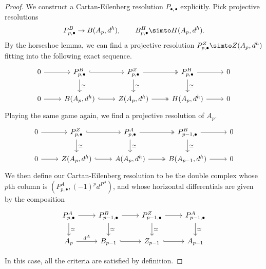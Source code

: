 \documentclass[main.tex]{subfiles}
\begin{document}
\begin{proof}
  We construct a Cartan-Eilenberg resolution $P_{\bullet,\bullet}$ explicitly. Pick projective resolutions
  \begin{equation*}
    P^{B}_{p,\bullet} \to B(A_{p}, d^{h}),\qquad B^{H}_{p,\bullet} \simto H(A_{p}, d^{h}).
  \end{equation*}
  By the horseshoe lemma, we can find a projective resolution $P^{Z}_{p,\bullet} \simto Z(A_{p}, d^{h})$ fitting into the following exact sequence.
  \begin{equation}
    \label{eq:cartan_eilenberg_resolution_ses_1}
    \begin{tikzcd}
      0
      \arrow[r]
      & P^{B}_{p,\bullet}
      \arrow[r, hook]
      \arrow[d, "\simeq"]
      & P^{Z}_{p,\bullet}
      \arrow[r, two heads]
      \arrow[d, "\simeq"]
      & P^{H}_{p,\bullet}
      \arrow[r]
      \arrow[d, "\simeq"]
      & 0
      \\
      0
      \arrow[r]
      & B(A_{p}, d^{h})
      \arrow[r, hook]
      & Z(A_{p}, d^{h})
      \arrow[r, two heads]
      & H(A_{p}, d^{h})
      \arrow[r]
      & 0
    \end{tikzcd}
  \end{equation}
  Playing the same game again, we find a projective resolution of $A_{p}$.
  \begin{equation}
    \label{eq:cartan_eilenberg_resolution_ses_2}
    \begin{tikzcd}
      0
      \arrow[r]
      & P^{Z}_{p,\bullet}
      \arrow[r, hook]
      \arrow[d, "\simeq"]
      & P^{A}_{p,\bullet}
      \arrow[r, two heads]
      \arrow[d, "\simeq"]
      & P^{B}_{p-1,\bullet}
      \arrow[r]
      \arrow[d, "\simeq"]
      & 0
      \\
      0
      \arrow[r]
      & Z(A_{p}, d^{h})
      \arrow[r, hook]
      & A(A_{p}, d^{h})
      \arrow[r, two heads]
      & B(A_{p-1}, d^{h})
      \arrow[r]
      & 0
    \end{tikzcd}
  \end{equation}
  We then define our Cartan-Eilenberg resolution to be the double complex whose $p$th column is $(P^{A}_{p,\bullet}, (-1)^{p}d^{P^{A}})$, and whose horizontal differentials are given by the composition
  \begin{equation}
    \label{eq:cartan_eilenberg_resolution_horizontal_differentials}
    \begin{tikzcd}
      P^{A}_{p, \bullet}
      \arrow[r]
      \arrow[d, "\simeq"]
      & P^{B}_{p-1, \bullet}
      \arrow[r]
      \arrow[d, "\simeq"]
      & P^{Z}_{p-1, \bullet}
      \arrow[r]
      \arrow[d, "\simeq"]
      & P^{A}_{p-1, \bullet}
      \arrow[d, "\simeq"]
      \\
      A_{p}
      \arrow[r, "d^{A}"]
      & B_{p-1}
      \arrow[r, hook]
      & Z_{p-1}
      \arrow[r, hook]
      & A_{p-1}
    \end{tikzcd}
  \end{equation}

  In this case, all the criteria are satisfied by definition.
\end{proof}
\end{document}
